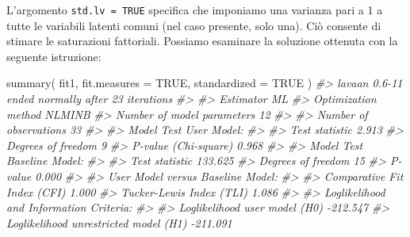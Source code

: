 \documentclass[
  11pt,
]{krantz}
\makeatletter
\newenvironment{Shaded}{\begin{snugshade}}{\end{snugshade}}
\newcommand{\AttributeTok}[1]{\textcolor[rgb]{0.61,0.61,0.61}{#1}}
\newcommand{\CommentTok}[1]{\textcolor[rgb]{0.37,0.37,0.37}{\textit{#1}}}
\newcommand{\ConstantTok}[1]{\textcolor[rgb]{0,0,0}{#1}}
\newcommand{\FunctionTok}[1]{\textcolor[rgb]{0,0,0}{#1}}
\newcommand{\NormalTok}[1]{#1}
\newenvironment{kframe}{%
\medskip{}
\setlength{\fboxsep}{.8em}
 \def\at@end@of@kframe{}%
 \ifinner\ifhmode%
  \def\at@end@of@kframe{\end{minipage}}%
  \begin{minipage}{\columnwidth}%
 \fi\fi%
 \def\FrameCommand##1{\hskip\@totalleftmargin \hskip-\fboxsep
 \colorbox{shadecolor}{##1}\hskip-\fboxsep
     \hskip-\linewidth \hskip-\@totalleftmargin \hskip\columnwidth}%
 \MakeFramed {\advance\hsize-\width
   \@totalleftmargin\z@ \linewidth\hsize
   \@setminipage}}%
 {\par\unskip\endMakeFramed%
 \at@end@of@kframe}
\renewenvironment{Shaded}{\begin{kframe}}{\end{kframe}}
\theoremstyle{definition}
\theoremstyle{definition}
\theoremstyle{definition}
\theoremstyle{definition}
\theoremstyle{remark}
\makeatother
\begin{document}
L'argomento \texttt{std.lv\ =\ TRUE} specifica che imponiamo una varianza pari a 1 a tutte le variabili latenti comuni (nel caso presente, solo una). Ciò consente di stimare le saturazioni fattoriali. Possiamo esaminare la soluzione ottenuta con la seguente istruzione:

\begin{Shaded}
\begin{Highlighting}[]
\FunctionTok{summary}\NormalTok{(}
\NormalTok{  fit1,}
  \AttributeTok{fit.measures =} \ConstantTok{TRUE}\NormalTok{,}
  \AttributeTok{standardized =} \ConstantTok{TRUE}
\NormalTok{)}
\CommentTok{\#\textgreater{} lavaan 0.6{-}11 ended normally after 23 iterations}
\CommentTok{\#\textgreater{} }
\CommentTok{\#\textgreater{}   Estimator                                         ML}
\CommentTok{\#\textgreater{}   Optimization method                           NLMINB}
\CommentTok{\#\textgreater{}   Number of model parameters                        12}
\CommentTok{\#\textgreater{}                                                       }
\CommentTok{\#\textgreater{}   Number of observations                            33}
\CommentTok{\#\textgreater{}                                                       }
\CommentTok{\#\textgreater{} Model Test User Model:}
\CommentTok{\#\textgreater{}                                                       }
\CommentTok{\#\textgreater{}   Test statistic                                 2.913}
\CommentTok{\#\textgreater{}   Degrees of freedom                                 9}
\CommentTok{\#\textgreater{}   P{-}value (Chi{-}square)                           0.968}
\CommentTok{\#\textgreater{} }
\CommentTok{\#\textgreater{} Model Test Baseline Model:}
\CommentTok{\#\textgreater{} }
\CommentTok{\#\textgreater{}   Test statistic                               133.625}
\CommentTok{\#\textgreater{}   Degrees of freedom                                15}
\CommentTok{\#\textgreater{}   P{-}value                                        0.000}
\CommentTok{\#\textgreater{} }
\CommentTok{\#\textgreater{} User Model versus Baseline Model:}
\CommentTok{\#\textgreater{} }
\CommentTok{\#\textgreater{}   Comparative Fit Index (CFI)                    1.000}
\CommentTok{\#\textgreater{}   Tucker{-}Lewis Index (TLI)                       1.086}
\CommentTok{\#\textgreater{} }
\CommentTok{\#\textgreater{} Loglikelihood and Information Criteria:}
\CommentTok{\#\textgreater{} }
\CommentTok{\#\textgreater{}   Loglikelihood user model (H0)               {-}212.547}
\CommentTok{\#\textgreater{}   Loglikelihood unrestricted model (H1)       {-}211.091}

\end{Highlighting}
\end{Shaded}
\end{document}
